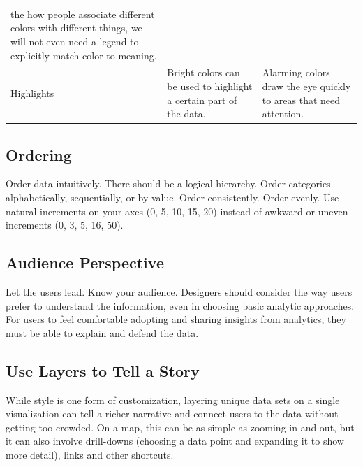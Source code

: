 \documentclass[]{book}
\theoremstyle{definition}
\theoremstyle{definition}
\theoremstyle{definition}
\theoremstyle{remark}
\begin{document}
\begin{longtable}[]{@{}lll@{}}
\begin{minipage}[t]{0.39\columnwidth}
the how people associate different colors with different things, we will
not even need a legend to explicitly match color to meaning.\strut
\end{minipage}\tabularnewline
\begin{minipage}[t]{0.10\columnwidth}\raggedright\strut
Highlights\strut
\end{minipage} & \begin{minipage}[t]{0.29\columnwidth}\raggedright\strut
Bright colors can be used to highlight a certain part of the data.\strut
\end{minipage} & \begin{minipage}[t]{0.39\columnwidth}\raggedright\strut
Alarming colors draw the eye quickly to areas that need attention.\strut
\end{minipage}\tabularnewline
\bottomrule
\end{longtable}

\subsection{Ordering}\label{ordering}

Order data intuitively. There should be a logical hierarchy. Order
categories alphabetically, sequentially, or by value. Order
consistently. Order evenly. Use natural increments on your axes (0, 5,
10, 15, 20) instead of awkward or uneven increments (0, 3, 5, 16, 50).

\subsection{Audience Perspective}\label{audience-perspective}

Let the users lead. Know your audience. Designers should consider the
way users prefer to understand the information, even in choosing basic
analytic approaches. For users to feel comfortable adopting and sharing
insights from analytics, they must be able to explain and defend the
data.

\subsection{Use Layers to Tell a
Story}\label{use-layers-to-tell-a-story}

While style is one form of customization, layering unique data sets on a
single visualization can tell a richer narrative and connect users to
the data without getting too crowded. On a map, this can be as simple as
zooming in and out, but it can also involve drill-downs (choosing a data
point and expanding it to show more detail), links and other shortcuts.
\end{document}
